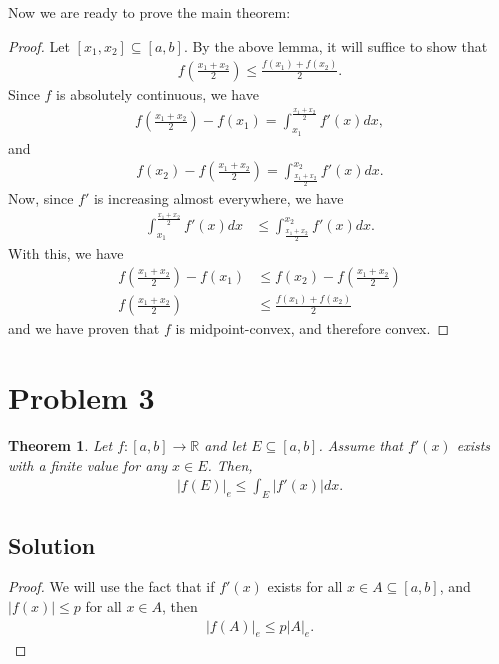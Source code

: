\documentclass[10pt,a4paper]{article}
\theoremstyle{theorem}
\newtheorem{theorem}{Theorem}
\theoremstyle{definition}
\begin{document}
Now we are ready to prove the main theorem:
\begin{proof}
Let $[x_1, x_2] \subseteq [a, b]$. By the above lemma, it will suffice to show that 
\begin{align*}
f \left(\frac{x_1 + x_2}{2} \right) \leq \frac{f(x_1) + f(x_2)}{2}.
\end{align*} 
Since $f$ is absolutely continuous, we have
\begin{align*}
f \left(\frac{x_1 + x_2}{2} \right) - f(x_1) = \int_{x_1}^{\frac{x_1 + x_2}{2}} f'(x)dx,
\end{align*}
and 
\begin{align*}
f(x_2) - f \left(\frac{x_1 + x_2}{2} \right) = \int_{\frac{x_1 + x_2}{2}}^{x_2} f'(x)dx.
\end{align*}
Now, since $f'$ is increasing almost everywhere, we have
\begin{align*}
\int_{x_1}^{\frac{x_1 + x_2}{2}} f'(x)dx &\leq \int_{\frac{x_1 + x_2}{2}}^{x_2} f'(x)dx.
\end{align*}
With this, we have
\begin{align*}
f \left(\frac{x_1 + x_2}{2} \right) - f(x_1) &\leq f(x_2) - f \left(\frac{x_1 + x_2}{2} \right)\\
f \left(\frac{x_1 + x_2}{2} \right) &\leq \frac{f(x_1) + f(x_2)}{2}
\end{align*}
and we have proven that $f$ is midpoint-convex, and therefore convex.
\end{proof}

\section*{Problem 3}
\begin{theorem}
Let $f:[a, b] \to \mathbb{R}$ and let $E \subseteq [a, b]$. Assume that $f'(x)$ exists with a finite value for any $x \in E$. Then,
\begin{align*}
|f(E)|_e \leq \int_E |f'(x)|dx.
\end{align*}
\end{theorem}

\subsection*{Solution}
\begin{proof}
We will use the fact that if $f'(x)$ exists for all $x \in A \subseteq [a, b]$, and $|f(x)| \leq p$ for all $x \in A$, then
\begin{align*}
|f(A)|_e \leq p|A|_e.
\end{align*}
\end{proof}
\end{document}

